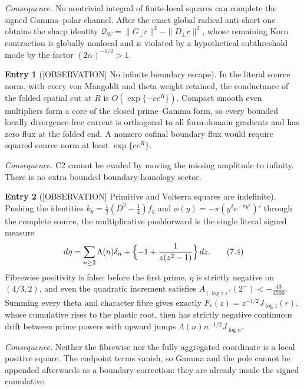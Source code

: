 \documentclass[11pt]{amsart}
\theoremstyle{definition}
\newcounter{family}
\newtheorem{entry}{Entry}[family]
\theoremstyle{remark}
\newcommand{\dd}{\,d}
\newcommand{\QW}{\mathcal Q_W}
\newcommand{\OBS}{\textup{[OBSERVATION]}}
\begin{document}
\emph{Consequence.} No nontrivial integral of finite-local squares can
complete the signed Gamma--polar channel.  After the exact global radical
anti-short one obtains the sharp identity
\(\QW=\|G_\perp r\|^2-\|D_\perp r\|^2\), whose remaining Korn contraction
is globally nonlocal and is violated by a hypothetical subthreshold mode
by the factor \((2\alpha)^{-1/2}>1\).

\begin{entry}[\OBS{} No infinite boundary escape]
\label{ent:C3}
In the literal source norm, with every von Mangoldt and theta weight
retained, the conductance of the folded spatial cut at \(R\) is
\(O(\exp\{-ce^R\})\).  Compact smooth even multipliers form a core of the
closed prime--Gamma form, so every bounded locally divergence-free current
is orthogonal to all form-domain gradients and has zero flux at the folded
end.  A nonzero cofinal boundary flux would require squared source norm at
least \(\exp\{ce^R\}\).
\end{entry}

\emph{Consequence.} C2 cannot be evaded by moving the missing amplitude to
infinity.  There is no extra bounded boundary-homology sector.

\begin{entry}[\OBS{} Primitive and Volterra squares are indefinite]
\label{ent:C4}
Pushing the identities \(k_y=\frac12(D^2-\frac14)f_y\) and
\(\phi(y)=-\pi(y^3e^{-\pi y^2})'\) through the complete source, the
multiplicative pushforward is the single literal signed measure
\[
 \dd\eta=\sum_{n\ge2}\Lambda(n)\delta_n
 +\Bigl\{-1+\frac1{z(z^2-1)}\Bigr\}\dd z .
\tag{7.4}
\]
Fibrewise positivity is false: before the first prime, \(\eta\) is
strictly negative on \((4/3,2)\), and even the quadratic increment
satisfies \(A_{(\log z)^2}(2^-)<-\frac{43}{4500}\).  Summing every theta
and character fibre gives exactly \(F_r(z)=z^{-1/2}J_{\log z}(r)\), whose
cumulative rises to the plastic root, then has strictly negative
continuous drift between prime powers with upward jumps
\(\Lambda(n)n^{-1/2}J_{\log n}\).
\end{entry}

\emph{Consequence.} Neither the fibrewise nor the fully aggregated
coordinate is a local positive square.  The endpoint terms vanish, so
Gamma and the pole cannot be appended afterwards as a boundary
correction: they are already inside the signed cumulative.
\end{document}
